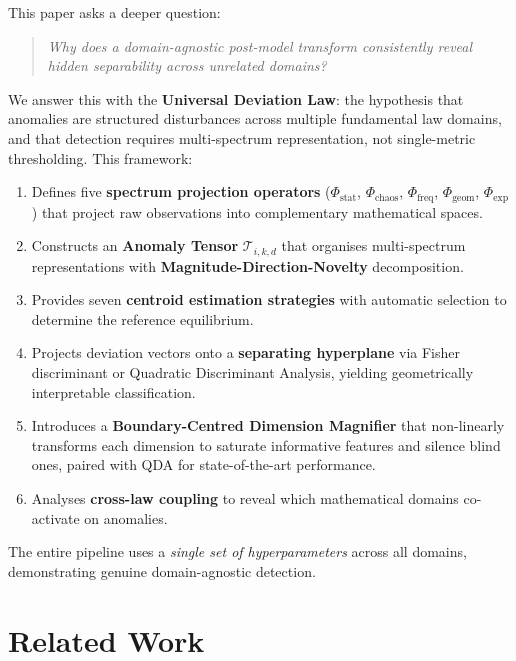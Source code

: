 \documentclass[journal]{IEEEtran}
\newcommand{\T}{\mathcal{T}}
\begin{document}
This paper asks a deeper question:

\begin{quote}
\textit{Why does a domain-agnostic post-model transform consistently reveal hidden separability across unrelated domains?}
\end{quote}

We answer this with the \textbf{Universal Deviation Law}: the hypothesis that anomalies are structured disturbances across multiple fundamental law domains, and that detection requires multi-spectrum representation, not single-metric thresholding. This framework:

\begin{enumerate}
  \item Defines five \textbf{spectrum projection operators} ($\Phi_{\text{stat}}$, $\Phi_{\text{chaos}}$, $\Phi_{\text{freq}}$, $\Phi_{\text{geom}}$, $\Phi_{\text{exp}}$) that project raw observations into complementary mathematical spaces.
  \item Constructs an \textbf{Anomaly Tensor} $\T_{i,k,d}$ that organises multi-spectrum representations with \textbf{Magnitude-Direction-Novelty} decomposition.
  \item Provides seven \textbf{centroid estimation strategies} with automatic selection to determine the reference equilibrium.
  \item Projects deviation vectors onto a \textbf{separating hyperplane} via Fisher discriminant or Quadratic Discriminant Analysis, yielding geometrically interpretable classification.
  \item Introduces a \textbf{Boundary-Centred Dimension Magnifier} that non-linearly transforms each dimension to saturate informative features and silence blind ones, paired with QDA for state-of-the-art performance.
  \item Analyses \textbf{cross-law coupling} to reveal which mathematical domains co-activate on anomalies.
\end{enumerate}

The entire pipeline uses a \textit{single set of hyperparameters} across all domains, demonstrating genuine domain-agnostic detection.

\section{Related Work}
\label{sec:related}
\end{document}
